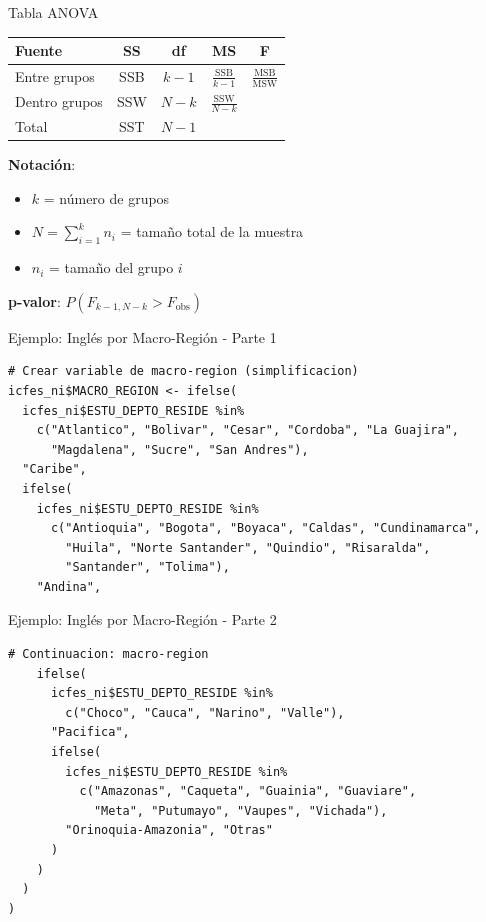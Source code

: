 \documentclass[aspectratio=169, 11pt]{beamer}
\begin{document}
\begin{frame}{Tabla ANOVA}
\begin{table}
\centering
\begin{tabular}{lcccc}
\toprule
\textbf{Fuente} & \textbf{SS} & \textbf{df} & \textbf{MS} & \textbf{F} \\
\midrule
Entre grupos & SSB & $k-1$ & $\frac{\text{SSB}}{k-1}$ & $\frac{\text{MSB}}{\text{MSW}}$ \\[0.2cm]
Dentro grupos & SSW & $N-k$ & $\frac{\text{SSW}}{N-k}$ & \\[0.2cm]
Total & SST & $N-1$ & & \\
\bottomrule
\end{tabular}
\end{table}

\vspace{0.3cm}
\textbf{Notación}:
\begin{itemize}
  \item $k$ = número de grupos
  \item $N = \sum_{i=1}^k n_i$ = tamaño total de la muestra
  \item $n_i$ = tamaño del grupo $i$
\end{itemize}

\vspace{0.3cm}
\textbf{p-valor}: $P(F_{k-1, N-k} > F_{\text{obs}})$
\end{frame}

\begin{frame}[fragile]{Ejemplo: Inglés por Macro-Región - Parte 1}
\small
\begin{lstlisting}
# Crear variable de macro-region (simplificacion)
icfes_ni$MACRO_REGION <- ifelse(
  icfes_ni$ESTU_DEPTO_RESIDE %in%
    c("Atlantico", "Bolivar", "Cesar", "Cordoba", "La Guajira",
      "Magdalena", "Sucre", "San Andres"),
  "Caribe",
  ifelse(
    icfes_ni$ESTU_DEPTO_RESIDE %in%
      c("Antioquia", "Bogota", "Boyaca", "Caldas", "Cundinamarca",
        "Huila", "Norte Santander", "Quindio", "Risaralda",
        "Santander", "Tolima"),
    "Andina",
\end{lstlisting}
\end{frame}

\begin{frame}[fragile]{Ejemplo: Inglés por Macro-Región - Parte 2}
\small
\begin{lstlisting}
# Continuacion: macro-region
    ifelse(
      icfes_ni$ESTU_DEPTO_RESIDE %in%
        c("Choco", "Cauca", "Narino", "Valle"),
      "Pacifica",
      ifelse(
        icfes_ni$ESTU_DEPTO_RESIDE %in%
          c("Amazonas", "Caqueta", "Guainia", "Guaviare",
            "Meta", "Putumayo", "Vaupes", "Vichada"),
        "Orinoquia-Amazonia", "Otras"
      )
    )
  )
)
\end{lstlisting}
\end{frame}
\end{document}
